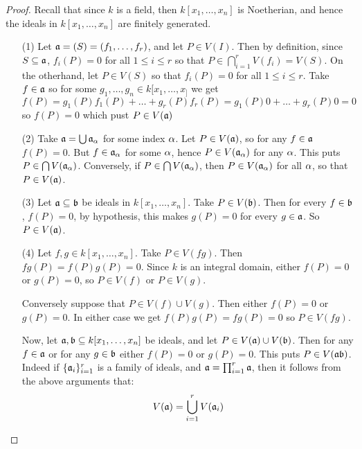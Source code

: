 \begin{proof}
  Recall that since $k$ is a field, then $k[x_1, \dots, x_n]$ is
  Noetherian, and hence the ideals in $k[x_1, \dots, x_n]$ are
  finitely generated.
  \begin{enumerate}
    \item[(1)] Let $\af=(S)=(f_1, \dots, f_r)$, and let $P \in V(I)$.
      Then by definition, since $S \subseteq \af$, $f_i(P)=0$ for all
      $1 \leq i \leq r$ so that $P \in \bigcap_{i=1}^r{V(f_i)}=V(S)$.
      On the otherhand, let $P \in V(S)$ so that $f_i(P)=0$ for all $1
      \leq i \leq r$. Take $f \in \af$ so for some $g_1, \dots, g_n
      \in k[x_1, \dots, x_]$ we get
      \begin{equation*}
        f(P)=g_1(P)f_1(P)+\dots+g_r(P)f_r(P)=
        g_1(P)0+\dots+g_r(P)0=0
      \end{equation*}
      so $f(P)=0$ which pust $P \in V(\af)$

    \item[(2)] Take $\af=\bigcup{\af_\a}$ for some index $\a$. Let $P
      \in V(\af)$, so for any $f \in \af$ $f(P)=0$. But $f \in \af_\a$
      for some $\a$, hence $P \in V(\af_\a)$ for any $\a$. This puts
      $P  \in \bigcap{V(\af_\a)}$. Conversely, if $P \in
      \bigcap{V(\af_\a)}$, then $P \in V(\af_\a)$ for all $\a$, so
      that $P \in V(\af)$.

    \item[(3)] Let $\af \subseteq \bf$ be ideals in $k[x_1, \dots,
      x_n]$. Take $P \in V(\bf)$. Then for every $f \in \bf$,
      $f(P)=0$, by hypothesis, this makes $g(P)=0$ for every $g \in
      \af$. So $P \in V(\af)$.

    \item[(4)] Let $f,g \in k[x_1, \dots, x_n]$. Take $P \in V(fg)$.
      Then $fg(P)=f(P)g(P)=0$. Since $k$ is an integral domain, either
      $f(P)=0$ or $g(P)=0$, so $P \in V(f)$ or $P \in V(g)$.

      Conversely suppose that $P  \in V(f) \cup V(g)$. Then either
      $f(P)=0$ or $g(P)=0$. In either case we get $f(P)g(P)=fg(P)=0$
      so $P \in V(fg)$.

      Now, let $\af, \bf \subseteq k[x_1, \dots, x_n]$ be ideals, and
      let $P \in V(\af) \cup V(\bf)$. Then for any $f \in \af$ or for
      any $g \in \bf$ either $f(P)=0$ or $g(P)=0$. This puts $P \in
      V(\af\bf)$. Indeed if $\{\af_i\}_{i=1}^r$ is a family of ideals,
      and $\af=\prod_{i=1}^r{\af}$, then it follows from the above
      arguments that:
      \begin{equation*}
        V(\af)=\bigcup_{i=1}^r{V(\af_i)}
      \end{equation*}


\end{enumerate}
\end{proof}
